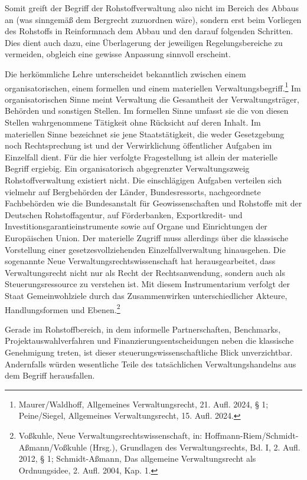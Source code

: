 \documentclass[12pt,a4paper,oneside]{book} %
\begin{document}
	Somit greift der Begriff der Rohstoffverwaltung also nicht im Bereich des Abbaus an (was sinngemäß dem Bergrecht zuzuordnen wäre), sondern erst beim Vorliegen des Rohstoffs \glqq in Reinform\grqq nach dem Abbau und den darauf folgenden Schritten. Dies dient auch dazu, eine Überlagerung der jeweiligen Regelungsbereiche zu vermeiden, obgleich eine gewisse Anpassung sinnvoll erscheint.
	
	Die herkömmliche Lehre unterscheidet bekanntlich zwischen einem organisatorischen, einem formellen und einem materiellen Verwaltungsbegriff.\footnote{Maurer/Waldhoff, Allgemeines Verwaltungsrecht, 21. Aufl. 2024, § 1; Peine/Siegel, Allgemeines Verwaltungsrecht, 15. Aufl. 2024.} Im organisatorischen Sinne meint Verwaltung die Gesamtheit der Verwaltungsträger, Behörden und sonstigen Stellen. Im formellen Sinne umfasst sie die von diesen Stellen wahrgenommene Tätigkeit ohne Rücksicht auf deren Inhalt. Im materiellen Sinne bezeichnet sie jene Staatstätigkeit, die weder Gesetzgebung noch Rechtsprechung ist und der Verwirklichung öffentlicher Aufgaben im Einzelfall dient. Für die hier verfolgte Fragestellung ist allein der materielle Begriff ergiebig. Ein organisatorisch abgegrenzter Verwaltungszweig Rohstoffverwaltung existiert nicht. Die einschlägigen Aufgaben verteilen sich vielmehr auf Bergbehörden der Länder, Bundesressorts, nachgeordnete Fachbehörden wie die Bundesanstalt für Geowissenschaften und Rohstoffe mit der Deutschen Rohstoffagentur, auf Förderbanken, Exportkredit- und Investitionsgarantieinstrumente sowie auf Organe und Einrichtungen der Europäischen Union. Der materielle Zugriff muss allerdings über die klassische Vorstellung einer gesetzesvollziehenden Einzelfallverwaltung hinausgehen. Die sogenannte Neue Verwaltungsrechtswissenschaft hat herausgearbeitet, dass Verwaltungsrecht nicht nur als Recht der Rechtsanwendung, sondern auch als Steuerungsressource zu verstehen ist. Mit diesem Instrumentarium verfolgt der Staat Gemeinwohlziele durch das Zusammenwirken unterschiedlicher Akteure, Handlungsformen und Ebenen.\footnote{Voßkuhle, Neue Verwaltungsrechtswissenschaft, in: Hoffmann-Riem/Schmidt-Aßmann/Voßkuhle (Hrsg.), Grundlagen des Verwaltungsrechts, Bd. I, 2. Aufl. 2012, § 1; Schmidt-Aßmann, Das allgemeine Verwaltungsrecht als Ordnungsidee, 2. Aufl. 2004, Kap. 1.}
	
	Gerade im Rohstoffbereich, in dem informelle Partnerschaften, Benchmarks, Projektauswahlverfahren und Finanzierungsentscheidungen neben die klassische Genehmigung treten, ist dieser steuerungswissenschaftliche Blick unverzichtbar. Andernfalls würden wesentliche Teile des tatsächlichen Verwaltungshandelns aus dem Begriff herausfallen.
	
\end{document}
